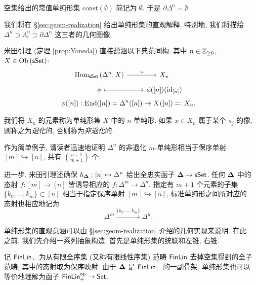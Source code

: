 空集给出的常值单纯形集 $\mathrm{const}(\emptyset)$ 简记为 $\emptyset$. 于是 $\partial \Delta^0 = \emptyset$.

我们将在 \S\ref{sec:geom-realization} 给出单纯形集的直观解释, 特别地, 我们将描绘 $\Delta^n \supset \Lambda^n_i \supset \partial \Delta^n$ 这三者的几何图像.

米田引理 (定理 \ref{prop:Yoneda}) 直接蕴涵以下典范同构, 其中 $n \in \mathbb{Z}_{\geq 0}$, $X \in \operatorname{Ob}\left( \mathsf{sSet} \right)$:
\begin{equation}\begin{gathered}
	\begin{tikzcd}[row sep=tiny]
		\Hom_{\cate{sSet}}\left( \Delta^n, X \right) \arrow[r, "\sim"] & X_n \\
		\phi \arrow[mapsto, r] & \phi([n])(\identity_{[n]})
	\end{tikzcd} \\
	\phi([n]): \End([n]) = \Delta^n([n]) \to X([n]) =: X_n.
\end{gathered}\end{equation}

\begin{definition}\label{def:simplex}
	我们将 $X_n$ 的元素称为单纯形集 $X$ 中的 $n$-单纯形. 如果 $x \in X_n$ 属于某个 $s_j$ 的像, 则称之为\emph{退化}的, 否则称为\emph{非退化}的.
\end{definition}

作为简单例子, 请读者迅速地证明 $\Delta^n$ 的非退化 $m$-单纯形相当于保序单射 $[m] \hookrightarrow [n]$, 共有 $\binom{n+1}{m+1}$ 个.

进一步, 米田引理还确保 $h_{\bm\Delta}: [n] \mapsto \Delta^n$ 给出全忠实函子 $\bm\Delta \to \mathsf{sSet}$. 任何 $\bm\Delta$ 中的态射 $f: [m] \to [n]$ 皆诱导相应的 $f: \Delta^m \to \Delta^n$. 指定有 $m+1$ 个元素的子集 $\{k_0, \ldots, k_m\} \subset [n]$ 相当于指定保序单射 $[m] \hookrightarrow [n]$, 标准单纯形之间所对应的态射也相应地记为
\[ \Delta^m \xrightarrow{\{k_0, \ldots, k_m\}} \Delta^n . \]

单纯形集的直观意涵可以由 \S\ref{sec:geom-realization} 介绍的几何实现来说明. 在此之前, 我们先介绍一系列抽象构造. 首先是单纯形集的统联和左锥, 右锥.

记 $\mathsf{FinLin}_+$ 为从有限全序集 (又称有限线性序集) 范畴 $\mathsf{FinLin}$ 去掉空集得到的全子范畴, 其中的态射取为保序映射. 由于 $\bm\Delta$ 是 $\mathsf{FinLin}_+$ 的一副骨架, 单纯形集也可以等价地理解为函子 $\mathsf{FinLin}_+^{\operatorname{op}} \to \mathsf{Set}$.

